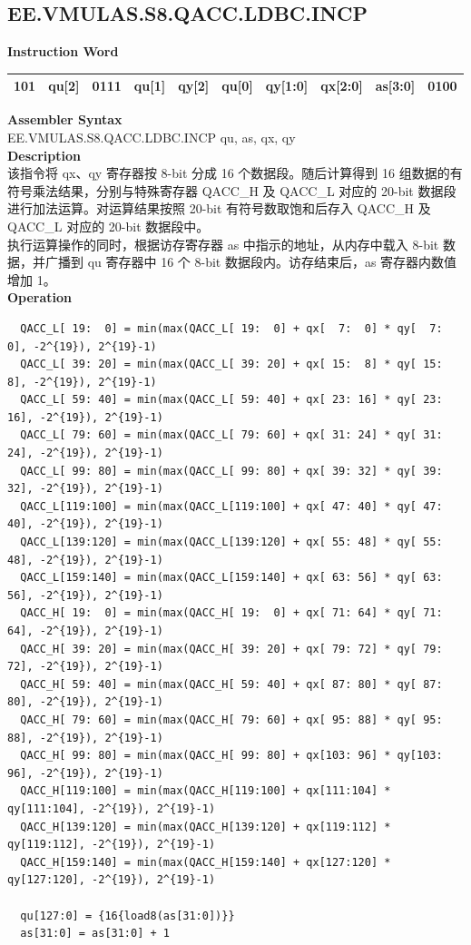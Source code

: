 \clearpage
\subsection{EE.VMULAS.S8.QACC.LDBC.INCP}\label{instruction:EEVMULASS8QACCLDBCINCP}
\setlength\tabcolsep{6pt}
\textbf{Instruction Word} \\
\begin{tabular}{|c|c|c|c|c|c|c|c|c|c|}
	\hline
	101 & qu[2] & 0111 & qu[1] & qy[2] & qu[0] & qy[1:0] & qx[2:0] & as[3:0] & 0100 \\
	\hline
\end{tabular}

\textbf{Assembler Syntax} \\
EE.VMULAS.S8.QACC.LDBC.INCP qu, as, qx, qy \\
\textbf{Description} \\
该指令将 qx、qy 寄存器按 8-bit 分成 16 个数据段。随后计算得到 16 组数据的有符号乘法结果，分别与特殊寄存器 QACC\_H 及 QACC\_L 对应的 20-bit 数据段进行加法运算。对运算结果按照 20-bit 有符号数取饱和后存入 QACC\_H 及 QACC\_L 对应的 20-bit 数据段中。\\
执行运算操作的同时，根据访存寄存器 as 中指示的地址，从内存中载入 8-bit 数据，并广播到 qu 寄存器中 16 个 8-bit 数据段内。访存结束后，as 寄存器内数值增加 1。\\
\textbf{Operation}
\begin{lstlisting}
  QACC_L[ 19:  0] = min(max(QACC_L[ 19:  0] + qx[  7:  0] * qy[  7:  0], -2^{19}), 2^{19}-1)
  QACC_L[ 39: 20] = min(max(QACC_L[ 39: 20] + qx[ 15:  8] * qy[ 15:  8], -2^{19}), 2^{19}-1)
  QACC_L[ 59: 40] = min(max(QACC_L[ 59: 40] + qx[ 23: 16] * qy[ 23: 16], -2^{19}), 2^{19}-1)
  QACC_L[ 79: 60] = min(max(QACC_L[ 79: 60] + qx[ 31: 24] * qy[ 31: 24], -2^{19}), 2^{19}-1)
  QACC_L[ 99: 80] = min(max(QACC_L[ 99: 80] + qx[ 39: 32] * qy[ 39: 32], -2^{19}), 2^{19}-1)
  QACC_L[119:100] = min(max(QACC_L[119:100] + qx[ 47: 40] * qy[ 47: 40], -2^{19}), 2^{19}-1)
  QACC_L[139:120] = min(max(QACC_L[139:120] + qx[ 55: 48] * qy[ 55: 48], -2^{19}), 2^{19}-1)
  QACC_L[159:140] = min(max(QACC_L[159:140] + qx[ 63: 56] * qy[ 63: 56], -2^{19}), 2^{19}-1)
  QACC_H[ 19:  0] = min(max(QACC_H[ 19:  0] + qx[ 71: 64] * qy[ 71: 64], -2^{19}), 2^{19}-1)
  QACC_H[ 39: 20] = min(max(QACC_H[ 39: 20] + qx[ 79: 72] * qy[ 79: 72], -2^{19}), 2^{19}-1)
  QACC_H[ 59: 40] = min(max(QACC_H[ 59: 40] + qx[ 87: 80] * qy[ 87: 80], -2^{19}), 2^{19}-1)
  QACC_H[ 79: 60] = min(max(QACC_H[ 79: 60] + qx[ 95: 88] * qy[ 95: 88], -2^{19}), 2^{19}-1)
  QACC_H[ 99: 80] = min(max(QACC_H[ 99: 80] + qx[103: 96] * qy[103: 96], -2^{19}), 2^{19}-1)
  QACC_H[119:100] = min(max(QACC_H[119:100] + qx[111:104] * qy[111:104], -2^{19}), 2^{19}-1)
  QACC_H[139:120] = min(max(QACC_H[139:120] + qx[119:112] * qy[119:112], -2^{19}), 2^{19}-1)
  QACC_H[159:140] = min(max(QACC_H[159:140] + qx[127:120] * qy[127:120], -2^{19}), 2^{19}-1)

  qu[127:0] = {16{load8(as[31:0])}}
  as[31:0] = as[31:0] + 1
\end{lstlisting}

